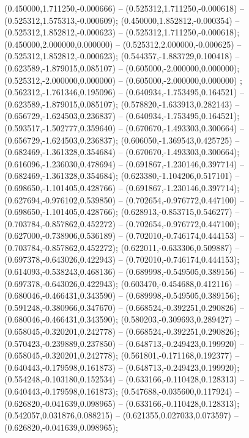  (0.450000,1.711250,-0.000666) -- (0.525312,1.711250,-0.000618) -- (0.525312,1.575313,-0.000609);
 (0.450000,1.852812,-0.000354) -- (0.525312,1.852812,-0.000623) -- (0.525312,1.711250,-0.000618);
 (0.450000,2.000000,0.000000) -- (0.525312,2.000000,-0.000625) -- (0.525312,1.852812,-0.000623);
 (0.544357,-1.883729,0.100418) -- (0.623589,-1.879015,0.085107) -- (0.605000,-2.000000,0.000000);
 (0.525312,-2.000000,0.000000) -- (0.605000,-2.000000,0.000000) ;
 (0.562312,-1.761346,0.195096) -- (0.640934,-1.753495,0.164521) -- (0.623589,-1.879015,0.085107);
 (0.578820,-1.633913,0.282143) -- (0.656729,-1.624503,0.236837) -- (0.640934,-1.753495,0.164521);
 (0.593517,-1.502777,0.359640) -- (0.670670,-1.493303,0.300664) -- (0.656729,-1.624503,0.236837);
 (0.606050,-1.369543,0.425725) -- (0.682469,-1.361328,0.354684) -- (0.670670,-1.493303,0.300664);
 (0.616096,-1.236030,0.478694) -- (0.691867,-1.230146,0.397714) -- (0.682469,-1.361328,0.354684);
 (0.623380,-1.104206,0.517101) -- (0.698650,-1.101405,0.428766) -- (0.691867,-1.230146,0.397714);
 (0.627694,-0.976102,0.539850) -- (0.702654,-0.976772,0.447100) -- (0.698650,-1.101405,0.428766);
 (0.628913,-0.853715,0.546277) -- (0.703784,-0.857862,0.452272) -- (0.702654,-0.976772,0.447100);
 (0.627000,-0.738906,0.536189) -- (0.702010,-0.746174,0.444153) -- (0.703784,-0.857862,0.452272);
 (0.622011,-0.633306,0.509887) -- (0.697378,-0.643026,0.422943) -- (0.702010,-0.746174,0.444153);
 (0.614093,-0.538243,0.468136) -- (0.689998,-0.549505,0.389156) -- (0.697378,-0.643026,0.422943);
 (0.603470,-0.454688,0.412116) -- (0.680046,-0.466431,0.343590) -- (0.689998,-0.549505,0.389156);
 (0.591248,-0.380966,0.347670) -- (0.668524,-0.392251,0.290826) -- (0.680046,-0.466431,0.343590);
 (0.580203,-0.309693,0.289427) -- (0.658045,-0.320201,0.242778) -- (0.668524,-0.392251,0.290826);
 (0.570423,-0.239889,0.237850) -- (0.648713,-0.249423,0.199920) -- (0.658045,-0.320201,0.242778);
 (0.561801,-0.171168,0.192377) -- (0.640443,-0.179598,0.161873) -- (0.648713,-0.249423,0.199920);
 (0.554248,-0.103180,0.152534) -- (0.633166,-0.110428,0.128313) -- (0.640443,-0.179598,0.161873);
 (0.547688,-0.035600,0.117924) -- (0.626820,-0.041639,0.098965) -- (0.633166,-0.110428,0.128313);
 (0.542057,0.031876,0.088215) -- (0.621355,0.027033,0.073597) -- (0.626820,-0.041639,0.098965);

